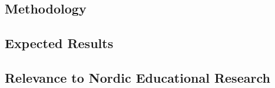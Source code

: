 \subsection{Methodology}



\subsection{Expected Results}

\subsection{Relevance to Nordic Educational Research}